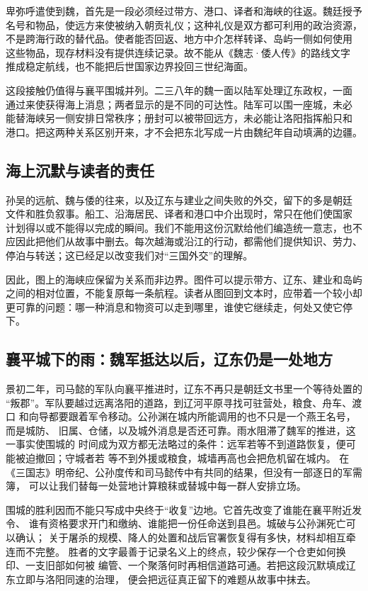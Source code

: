卑弥呼遣使到魏，首先是一段必须经过带方、港口、译者和海峡的往返。魏廷授予
名号和物品，使远方来使被纳入朝贡礼仪；这种礼仪是双方都可利用的政治资源，
不是跨海行政的替代品。使者能否回返、地方中介怎样转译、岛屿一侧如何使用
这些物品，现存材料没有提供连续记录。故不能从《魏志·倭人传》的路线文字
推成稳定航线，也不能把后世国家边界投回三世纪海面。

这段接触仍值得与襄平围城并列。二三八年的魏一面以陆军处理辽东政权，一面
通过来使获得海上消息；两者显示的是不同的可达性。陆军可以围一座城，未必
能替海峡另一侧安排日常秩序；册封可以被带回远方，未必能让洛阳指挥船只和
港口。把这两种关系区别开来，才不会把东北写成一片由魏纪年自动填满的边疆。

\subsection{海上沉默与读者的责任}

孙吴的远航、魏与倭的往来，以及辽东与建业之间失败的外交，留下的多是朝廷
文件和胜负叙事。船工、沿海居民、译者和港口中介出现时，常只在他们使国家
计划得以或不能得以完成的瞬间。我们不能用这份沉默给他们编造统一意志，也不
应因此把他们从故事中删去。每次越海或沿江的行动，都需他们提供知识、劳力、
停泊与转送；这已经足以改变我们对“三国外交”的理解。

因此，图上的海峡应保留为关系而非边界。图件可以提示带方、辽东、建业和岛屿
之间的相对位置，不能复原每一条航程。读者从图回到文本时，应带着一个较小却
更可靠的问题：哪一种消息和物资可以走到哪里，谁使它继续走，何处又使它停下。

\subsection{襄平城下的雨：魏军抵达以后，辽东仍是一处地方}

景初二年，司马懿的军队向襄平推进时，辽东不再只是朝廷文书里一个等待处置的
“叛郡”。军队要越过远离洛阳的道路，到辽河平原寻找可驻营处，粮食、舟车、渡口
和向导都要跟着军令移动。公孙渊在城内所能调用的也不只是一个燕王名号，而是城防、
旧属、仓储，以及城外消息是否还可靠。雨水阻滞了魏军的推进，这一事实使围城的
时间成为双方都无法略过的条件：远军若等不到道路恢复，便可能被迫撤回；守城者若
等不到外援或粮食，城墙再高也会把危机留在城内。
在《三国志》明帝纪、公孙度传和司马懿传中有共同的结果，但没有一部逐日的军需簿，
可以让我们替每一处营地计算粮秣或替城中每一群人安排立场。

围城的胜利因而不能只写成中央终于“收复”边地。它首先改变了谁能在襄平附近发令、
谁有资格要求开门和缴纳、谁能把一份任命送到县邑。城破与公孙渊死亡可以确认；
关于屠杀的规模、降人的处置和战后官署恢复得有多快，材料却相互牵连而不完整。
胜者的文字最善于记录名义上的终点，较少保存一个仓吏如何换印、一支旧部如何被
编管、一个聚落何时再相信道路可通。若把这段沉默填成辽东立即与洛阳同速的治理，
便会把远征真正留下的难题从故事中抹去。

